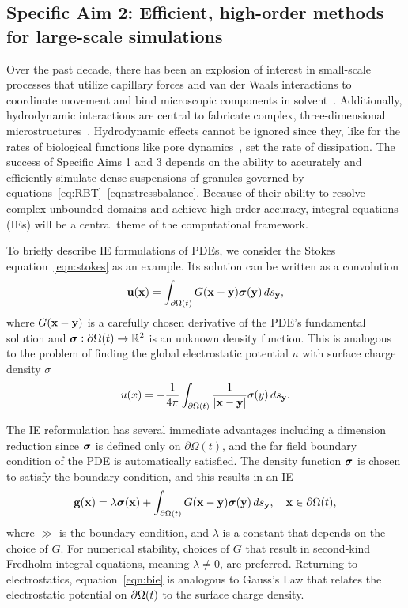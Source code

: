 \subsection{Specific Aim 2: Efficient, high-order methods for
large-scale simulations}
\label{sec:specificaim2}
Over the past decade, there has been an explosion of interest in
small-scale processes that utilize capillary forces and van der Waals
interactions to coordinate movement and bind microscopic components in
solvent~\cite{Pandey2011, Zhang2017, Siontorou2017}. Additionally,
hydrodynamic interactions are central to
fabricate complex,
three-dimensional microstructures~\cite{Dasgupta2017, Leong2007,
  Reynolds2019, Cho2010}.
Hydrodynamic effects cannot be ignored since
they, like for the rates of biological functions like pore
dynamics~\cite{RYHAM20112929}, set the rate of dissipation. The success
of Specific Aims 1 and 3 depends on the ability to accurately and
efficiently simulate dense suspensions of granules governed by
equations~\eqref{eq:RBT}--\eqref{eqn:stressbalance}. Because of their
ability to resolve complex unbounded domains and achieve high-order
accuracy, integral equations (IEs) will be a central theme of the
computational framework. 

To briefly describe IE formulations of PDEs, we consider the Stokes
equation~\eqref{eqn:stokes} as an example. Its solution can be written
as a convolution 
\begin{align*}
  \mathbf{u}(\mathbf{x}) = \int_{\partial\Omega(t)} G(\mathbf{x} - \mathbf{y}) \boldsymbol{\sigma}(\mathbf{y}) \, ds_{\mathbf{y}},
\end{align*}
where $G(\mathbf{x} - \mathbf{y})$ is a carefully chosen derivative of the PDE's
fundamental solution and $\boldsymbol{\sigma}: \partial \Omega(t) \rightarrow \mathbb{R}^2$
is an unknown density function. This is analogous to the problem of
finding the global electrostatic potential $u$ with surface charge
density $\sigma$
\begin{align*}
  u(x) = -\frac{1}{4\pi}\int_{\partial \Omega(t)} 
    \frac{1}{|\mathbf{x} - \mathbf{y}|}\sigma(y) \, ds_{\mathbf{y}}.
\end{align*}

The IE reformulation has several immediate advantages including a
dimension reduction since $\boldsymbol{\sigma}$ is defined only on $\partial
\Omega(t)$, and the far field boundary condition of the PDE is
automatically satisfied. The density function $\boldsymbol{\sigma}$ is chosen to
satisfy the boundary condition, and this results in an IE 
\begin{align}
  \mathbf{g}(\mathbf{x}) = \lambda \boldsymbol{\sigma}(\mathbf{x}) + 
    \int_{\partial\Omega(t)} G(\mathbf{x} - \mathbf{y}) \boldsymbol{\sigma}(\mathbf{y}) \, ds_{\mathbf{y}},
    \quad \mathbf{x} \in \partial\Omega(t),
  \label{eqn:bie}
\end{align} where $\gg$ is the boundary condition, and $\lambda$ is a
constant that depends on the choice of $G$. For numerical stability,
choices of $G$ that result in second-kind Fredholm integral equations,
meaning $\lambda \neq 0$, are preferred. Returning to electrostatics,
equation~\eqref{eqn:bie} is analogous to Gauss's Law that relates the
electrostatic potential on $\partial \Omega(t)$ to the surface charge
density.

